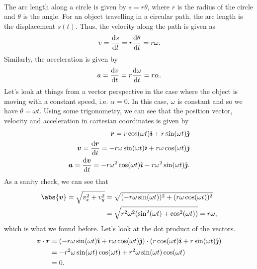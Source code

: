 \documentclass[../newtonian_mechanics.tex]{subfiles}
\begin{document}
        \paragraph{}
        The arc length along a circle is given by $s=r\theta$, where $r$ is the radius of the circle and $\theta$ is the angle.
        For an object travelling in a circular path, the arc length is the displacement $s(t)$.
        Thus, the velocity along the path is given as
        \begin{equation}
            v=\dv{s}{t}=r\dv{\theta}{t}=r\omega.
        \end{equation}
        Similarly, the acceleration is given by
        \begin{equation}
            a=\dv{v}{t}=r\dv{\omega}{t}=r\alpha.
        \end{equation}
        Let's look at things from a vector perspective in the case where the object is moving with a constant speed, i.e. $\alpha=0$.
        In this case, $\omega$ is constant and so we have $\theta=\omega t$.
        Using some trigonometry, we can see that the position vector, velocity and acceleration in cartesian coordinates is given by
        \begin{align}
            \vec{r}=r\cos(\omega t)\ihat+r\sin(\omega t)\jhat\\
            \vec{v}=\dv{\vec{r}}{t}=-r\omega\sin(\omega t)\ihat+r\omega\cos(\omega t)\jhat\\
            \vec{a}=\dv{\vec{v}}{t}=-r\omega^2\cos(\omega t)\ihat-r\omega^2\sin(\omega t)\jhat.
        \end{align}
        As a sanity check, we can see that
        \begin{align}
            \abs{\vec{v}}=\sqrt{v_x^2+v_y^2}&=\sqrt{(-r\omega\sin(\omega t))^2+(r\omega\cos(\omega t))^2}\\
            &=\sqrt{r^2\omega^2(\sin^2(\omega t)+\cos^2(\omega t))}=r\omega,
        \end{align}
        which is what we found before.
        Let's look at the dot product of the vectors.
        \begin{align}
            \boldsymbol{v}\cdot\boldsymbol{r}&=(-r\omega\sin(\omega t)\hat{\boldsymbol{\imath}}+r\omega\cos(\omega t)\hat{\boldsymbol{\jmath}})\cdot(r\cos(\omega t)\hat{\boldsymbol{\imath}}+r\sin(\omega t)\hat{\boldsymbol{\jmath}})\\
            &=-r^2\omega\sin(\omega t)\cos(\omega t)+r^2\omega\sin(\omega t)\cos(\omega t)\\
            &=0.
        \end{align}
\end{document}
